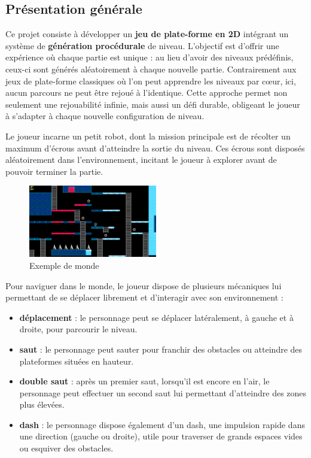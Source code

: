 \documentclass[10pt]{report}
\begin{document}
\subsection{Présentation générale}

Ce projet consiste à développer un \textbf{jeu de plate-forme en 2D} intégrant un système de \textbf{génération procédurale} de niveau.
L’objectif est d’offrir une expérience où chaque partie est unique : au lieu d’avoir des niveaux prédéfinis,
ceux-ci sont générés aléatoirement à chaque nouvelle partie.
Contrairement aux jeux de plate-forme classiques où l'on peut apprendre les niveaux par cœur, ici, aucun parcours ne
peut être rejoué à l’identique.
Cette approche permet non seulement une rejouabilité infinie, mais aussi un défi durable, obligeant le joueur
à s’adapter à chaque nouvelle configuration de niveau.

Le joueur incarne un petit robot, dont la mission principale est de récolter un maximum d’écrous
avant d’atteindre la sortie du niveau.
Ces écrous sont disposés aléatoirement dans l’environnement, incitant le joueur à explorer avant de pouvoir
terminer la partie.

\begin{figure}[H]
  \centering
  \includegraphics[width=0.5\textwidth]{images/world_example}
  \caption{Exemple de monde}
\end{figure}


Pour naviguer dans le monde, le joueur dispose de plusieurs mécaniques lui permettant de se déplacer librement et
d’interagir avec son environnement :
\begin{itemize}
  \item \textbf{déplacement} : le personnage peut se déplacer latéralement, à gauche et à droite,
  pour parcourir le niveau.
  \item \textbf{saut} : le personnage peut sauter pour franchir des obstacles ou atteindre des plateformes
  situées en hauteur.
  \item \textbf{double saut} : après un premier saut, lorsqu'il est encore en l’air, le personnage peut effectuer
  un second saut lui permettant d’atteindre des zones plus élevées.
  \item \textbf{dash} : le personnage dispose également d’un dash, une impulsion rapide dans une direction
  (gauche ou droite), utile pour traverser de grands espaces vides ou esquiver des obstacles.\\
\end{itemize}
\end{document}
